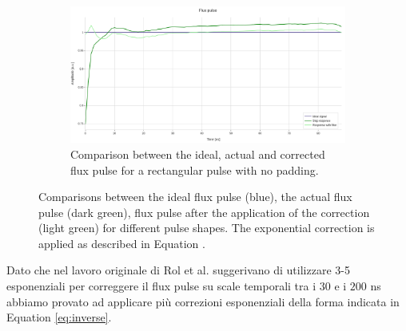 \begin{figure}[h!]
    \vspace{0.5cm}
    \begin{subfigure}[t]{0.65\textwidth}
        \includegraphics[width=\textwidth]{figures/png/Cryoscope/filters_long/inverse.png}
        \caption{Comparison between the ideal, actual and corrected flux pulse for a rectangular pulse with no padding.}
        \label{fig:inverse:long}    
    \end{subfigure}

    \caption{Comparisons between the ideal flux pulse (blue), the actual flux pulse (dark green), flux pulse after the application of the correction (light green) for different pulse shapes.
    The exponential correction is applied as described in Equation \label{eq:inverse}.}
    \label{fig:inverse_short}
\end{figure}

Dato che nel lavoro originale di Rol et al. suggerivano di utilizzare 3-5 esponenziali per correggere il flux pulse su scale temporali tra i $30$ e i $200$ ns abbiamo provato ad applicare più correzioni esponenziali della forma indicata in Equation \ref{eq:inverse}.

